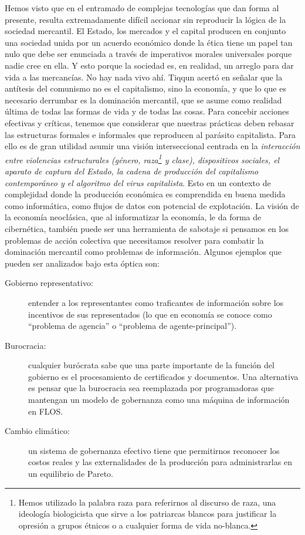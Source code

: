 Hemos visto que en el entramado de complejas tecnologías que dan forma al presente, resulta extremadamente difícil accionar sin reproducir la lógica de la sociedad mercantil. El Estado, los mercados y el capital producen en conjunto una sociedad unida por un acuerdo económico donde la ética tiene un papel tan nulo que debe ser enunciada a través de imperativos morales universales porque nadie cree en ella. Y esto porque la sociedad es, en realidad, un arreglo para dar vida a las mercancías. No hay nada vivo ahí. Tiqqun acertó en señalar que la antítesis del comunismo no es el capitalismo, sino la economía, y que lo que es necesario derrumbar es la dominación mercantil, que se asume como realidad última de todas las formas de vida y de todas las cosas. Para concebir acciones efectivas y críticas, tenemos que considerar que nuestras prácticas deben rebasar las estructuras formales e informales que reproducen al parásito capitalista. Para ello es de gran utilidad asumir una visión interseccional centrada en la \emph{interacción entre violencias estructurales (género, raza\footnote{Hemos utilizado la palabra raza para referirnos al discurso de raza, una ideología biologicista que sirve a los patriarcas blancos para justificar la opresión a grupos étnicos o a cualquier forma de vida no-blanca.} y clase), dispositivos sociales, el aparato de captura del Estado, la cadena de producción del capitalismo contemporáneo y el algoritmo del virus capitalista}. Esto en un contexto de complejidad donde la producción económica es comprendida en buena medida como informática, como flujos de datos con potencial de explotación. La visión de la economía neoclásica, que al informatizar la economía, le da forma de cibernética, también puede ser una herramienta de sabotaje si pensamos en los problemas de acción colectiva que necesitamos resolver para combatir la dominación mercantil como problemas de información. Algunos ejemplos que pueden ser analizados bajo esta óptica son:

\begin{description}
	\item[Gobierno representativo:] entender a los representantes como traficantes de información sobre los incentivos de sus representados (lo que en economía se conoce como \enquote{problema de agencia} o \enquote{problema de agente-principal}).

	\item[Burocracia:] cualquier burócrata sabe que una parte importante de la función del gobierno es el procesamiento de certificados y documentos. Una alternativa es pensar que la burocracia sea reemplazada por programadoras que mantengan un modelo de gobernanza como una máquina de información en FLOS.

	\item[Cambio climático:] un sistema de gobernanza efectivo tiene que permitirnos reconocer los costos reales y las externalidades de la producción para administrarlas en un equilibrio de Pareto.
\end{description}

